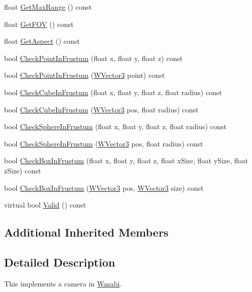 \begin{DoxyCompactItemize}
\item 
float \hyperlink{class_w_camera_a59ab75c472bbb3af15d1512436d3dc1f}{Get\+Max\+Range} () const 
\item 
float \hyperlink{class_w_camera_a8fabfeba271baa99fdfcae35dd966f1a}{Get\+F\+OV} () const 
\item 
float \hyperlink{class_w_camera_aeb1771e08c8e5f7e5064e0cf66601eb7}{Get\+Aspect} () const 
\item 
bool \hyperlink{class_w_camera_a8cb759213422225c4244f044ed6e0785}{Check\+Point\+In\+Frustum} (float x, float y, float z) const 
\item 
bool \hyperlink{class_w_camera_aebb55c0b8ebf3068b26b552f5f817b57}{Check\+Point\+In\+Frustum} (\hyperlink{class_w_vector3}{W\+Vector3} point) const 
\item 
bool \hyperlink{class_w_camera_a1c8d048c786d1f06fad1d4c626b70c1c}{Check\+Cube\+In\+Frustum} (float x, float y, float z, float radius) const 
\item 
bool \hyperlink{class_w_camera_a67885aed602059895e025348936ffe78}{Check\+Cube\+In\+Frustum} (\hyperlink{class_w_vector3}{W\+Vector3} pos, float radius) const 
\item 
bool \hyperlink{class_w_camera_a40a713c0385c345bb13b69e41c67f89e}{Check\+Sphere\+In\+Frustum} (float x, float y, float z, float radius) const 
\item 
bool \hyperlink{class_w_camera_ad903939a239697caa8f0b7a6dc6fc243}{Check\+Sphere\+In\+Frustum} (\hyperlink{class_w_vector3}{W\+Vector3} pos, float radius) const 
\item 
bool \hyperlink{class_w_camera_a4740f99cef774d046499eb361b5b89a2}{Check\+Box\+In\+Frustum} (float x, float y, float z, float x\+Size, float y\+Size, float z\+Size) const 
\item 
bool \hyperlink{class_w_camera_ade2dbaf0d351b4ae69c88e4fe3cec728}{Check\+Box\+In\+Frustum} (\hyperlink{class_w_vector3}{W\+Vector3} pos, \hyperlink{class_w_vector3}{W\+Vector3} size) const 
\item 
virtual bool \hyperlink{class_w_camera_a21af71c51c191beeec0d1dc5b836cc0c}{Valid} () const 
\end{DoxyCompactItemize}
\subsection*{Additional Inherited Members}


\subsection{Detailed Description}
This implements a camera in \hyperlink{class_wasabi}{Wasabi}. 

